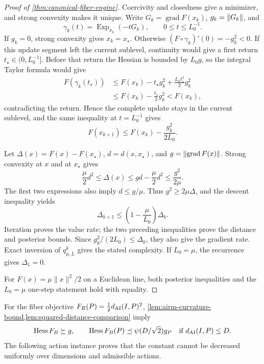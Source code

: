 \begin{proof}[Proof of \cref{thm:canonical-fiber-engine}]
Coercivity and closedness give a minimizer, and strong convexity makes it
unique.  Write \(G_k=\operatorname{grad}F(x_k)\),
\(g_k=\left\lVert G_k\right\rVert\), and
\[
  \gamma_k(t)=\operatorname{Exp}_{x_k}(-tG_k),
  \qquad 0\le t\le L_0^{-1}.
\]
If \(g_k=0\), strong convexity gives \(x_k=x_\star\).  Otherwise
\((F\circ\gamma_k)'(0)=-g_k^2<0\).  If this update segment left the current
sublevel, continuity would give a first return
\(t_\star\in(0,L_0^{-1}]\).  Before that return the Hessian is bounded by
\(L_0g\), so the integral Taylor formula would give
\[
\begin{aligned}
  F(\gamma_k(t_\star))
  &\le F(x_k)-t_\star g_k^2
       +\frac{L_0t_\star^2}{2}g_k^2\\
  &\le F(x_k)-\frac{t_\star}{2}g_k^2<F(x_k),
\end{aligned}
\]
contradicting the return.  Hence the complete update stays in the current
sublevel, and the same inequality at \(t=L_0^{-1}\) gives
\[
  F(x_{k+1})\le F(x_k)-\frac{g_k^2}{2L_0}.
\]

Let \(\Delta(x)=F(x)-F(x_\star)\),
\(d=d(x,x_\star)\), and
\(g=\left\lVert \operatorname{grad}F(x)\right\rVert\).  Strong convexity at \(x\) and at
\(x_\star\) gives
\[
  \frac{\mu}{2}d^2
  \le\Delta(x)
  \le gd-\frac{\mu}{2}d^2
  \le\frac{g^2}{2\mu}.
\]
The first two expressions also imply \(d\le g/\mu\).  Thus
\(g^2\ge2\mu\Delta\), and the descent inequality yields
\[
  \Delta_{k+1}
  \le\left(1-\frac{\mu}{L_0}\right)\Delta_k.
\]
Iteration proves the value rate; the two preceding inequalities prove the
distance and posterior bounds.  Since
\(g_k^2/(2L_0)\le\Delta_k\), they also give the gradient rate.  Exact
inversion of \(q_{\mu,L}^k\) gives the stated complexity.  If
\(L_0=\mu\), the recurrence gives \(\Delta_1=0\).

For \(F(x)=\mu\|x\|^2/2\) on a Euclidean line, both posterior inequalities
and the \(L_0=\mu\) one-step statement hold with equality.
\end{proof}

For the fiber objective \(F_B(P)=\tfrac12d_{\mathrm{AI}}(I,P)^2\),
\cref{lem:airm-curvature-bound,lem:squared-distance-comparison} imply
\begin{equation}
  \operatorname{Hess}F_B\succeq g,
  \qquad
  \operatorname{Hess}F_B(P)\preceq
  \psi(D/\sqrt2)g_P
  \quad\text{if }d_{\mathrm{AI}}(I,P)\le D.
  \label{eq:fiber-hessian-bounds}
\end{equation}
The following action instance proves that the constant cannot be decreased
uniformly over dimensions and admissible actions.

